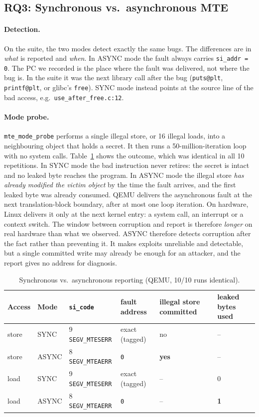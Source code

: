 \documentclass[11pt,a4paper]{article}
\begin{document}
\subsection{RQ3: Synchronous vs.\ asynchronous MTE}
\label{sec:mode}
\paragraph{Detection.}
On the suite, the two modes detect exactly the same bugs.
The differences are in \emph{what} is reported and \emph{when}.
In ASYNC mode the fault always carries \texttt{si\_addr = 0}.
The PC we recorded is the place where the fault was delivered, not where the bug is.
In the suite it was the next library call after the bug (\texttt{puts@plt}, \texttt{printf@plt}, or glibc's \texttt{free}).
SYNC mode instead points at the source line of the bad access, e.g.\ \texttt{use\_after\_free.c:12}.

\paragraph{Mode probe.}
\texttt{mte\_mode\_probe} performs a single illegal store, or 16 illegal loads, into a neighbouring object that holds a secret.
It then runs a 50-million-iteration loop with no system calls.
Table~\ref{tab:mode} shows the outcome, which was identical in all 10 repetitions.
In SYNC mode the bad instruction never retires: the secret is intact and no leaked byte reaches the program.
In ASYNC mode the illegal store \emph{has already modified the victim object} by the time the fault arrives, and the first leaked byte was already consumed.
QEMU delivers the asynchronous fault at the next translation-block boundary, after at most one loop iteration.
On hardware, Linux delivers it only at the next kernel entry: a system call, an interrupt or a context switch.
The window between corruption and report is therefore \emph{longer} on real hardware than what we observed.
ASYNC therefore detects corruption after the fact rather than preventing it.
It makes exploits unreliable and detectable, but a single committed write may already be enough for an attacker, and the report gives no address for diagnosis.

\begin{table}[t]
\centering\small
\begin{tabular}{@{}llllll@{}}
\toprule
Access & Mode & \texttt{si\_code} & fault address & illegal store committed & leaked bytes used\\
\midrule
store & SYNC & 9 \texttt{SEGV\_MTESERR} & exact (tagged) & no & --\\
store & ASYNC & 8 \texttt{SEGV\_MTEAERR} & \texttt{0} & \textbf{yes} & --\\
load & SYNC & 9 \texttt{SEGV\_MTESERR} & exact (tagged) & -- & 0\\
load & ASYNC & 8 \texttt{SEGV\_MTEAERR} & \texttt{0} & -- & \textbf{1}\\
\bottomrule
\end{tabular}
\caption{Synchronous vs.\ asynchronous reporting (QEMU, 10/10 runs identical).}
\label{tab:mode}
\end{table}
\end{document}
